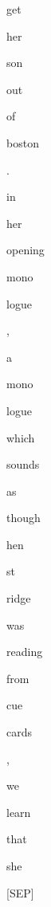 \documentclass[varwidth=150mm]{standalone}
\begin{document}
\begin{CJK*}{UTF8}{gbsn}
{{{\colorbox{red!7.224542617797852}{\strut get} \colorbox{red!3.488417625427246}{\strut her} \colorbox{red!14.14796257019043}{\strut son} \colorbox{red!12.742718696594238}{\strut out} \colorbox{red!21.534557342529297}{\strut of} \colorbox{red!72.66143798828125}{\strut boston} \colorbox{red!0.0}{\strut .} \colorbox{red!1.4935686588287354}{\strut in} \colorbox{red!18.56591033935547}{\strut her} \colorbox{red!7.267176151275635}{\strut opening} \colorbox{red!11.282069206237793}{\strut mono}\colorbox{red!40.215423583984375}{\strut logue} \colorbox{red!5.262695789337158}{\strut ,} \colorbox{red!1.632225751876831}{\strut a} \colorbox{red!1.7889047861099243}{\strut mono}\colorbox{red!17.27710723876953}{\strut logue} \colorbox{red!45.0362434387207}{\strut which} \colorbox{red!1.6272526979446411}{\strut sounds} \colorbox{red!5.094773769378662}{\strut as} \colorbox{red!0.0}{\strut though} \colorbox{red!12.192915916442871}{\strut hen}\colorbox{red!0.0}{\strut st}\colorbox{red!2.986990213394165}{\strut ridge} \colorbox{red!0.0}{\strut was} \colorbox{red!0.0}{\strut reading} \colorbox{red!0.0}{\strut from} \colorbox{red!1.0882306098937988}{\strut cue} \colorbox{red!0.0}{\strut cards} \colorbox{red!0.0}{\strut ,} \colorbox{red!4.9288010597229}{\strut we} \colorbox{red!5.610070705413818}{\strut learn} \colorbox{red!20.385986328125}{\strut that} \colorbox{red!34.25550842285156}{\strut she} \colorbox{red!1.7707966566085815}{\strut [SEP]}
}}}
\end{CJK*}
\end{document}
